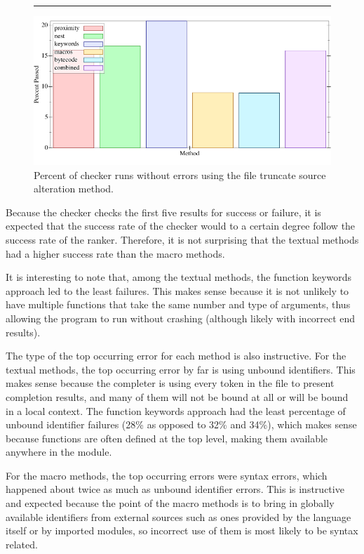 \documentclass[ms,electronic,twosidetoc,letterpaper,chaptercenter,parttop,lol,lof,lot]{byumsphd}
\begin{document}
\begin{figure}[h]
\centering
\hrule
\includegraphics[width=1.0\textwidth]{../output/synthesis/checker/Truncate-Percent.png}
\caption{Percent of checker runs without errors using the file truncate source alteration method.}
\label{checker-truncate-percent}
\end{figure}

Because the checker checks the first five results for success or failure, it is expected that the success rate of the checker would to a certain degree follow the success rate of the ranker.
Therefore, it is not surprising that the textual methods had a higher success rate than the macro methods.

It is interesting to note that, among the textual methods, the function keywords approach led to the least failures.
This makes sense because it is not unlikely to have multiple functions that take the same number and type of arguments, thus allowing the program to run without crashing (although likely with incorrect end results).

The type of the top occurring error for each method is also instructive.
For the textual methods, the top occurring error by far is using unbound identifiers.
This makes sense because the completer is using every token in the file to present completion results, and many of them will not be bound at all or will be bound in a local context.
The function keywords approach had the least percentage of unbound identifier failures (28\% as opposed to 32\% and 34\%), which makes sense because functions are often defined at the top level, making them available anywhere in the module.

For the macro methods, the top occurring errors were syntax errors, which happened about twice as much as unbound identifier errors.
This is instructive and expected because the point of the macro methods is to bring in globally available identifiers from external sources such as ones provided by the language itself or by imported modules, so incorrect use of them is most likely to be syntax related.
\end{document}
